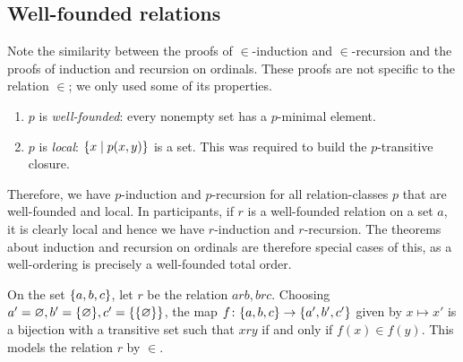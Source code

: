 \subsection{Well-founded relations}
Note the similarity between the proofs of \( \in \)-induction and \( \in \)-recursion and the proofs of induction and recursion on ordinals.
These proofs are not specific to the relation \( \in \); we only used some of its properties.
\begin{enumerate}
    \item \( p \) is \emph{well-founded}: every nonempty set has a \( p \)-minimal element.
    \item \( p \) is \emph{local}: \( \qty{x \mid p(x,y)} \) is a set.
    This was required to build the \( p \)-transitive closure.
\end{enumerate}
Therefore, we have \( p \)-induction and \( p \)-recursion for all relation-classes \( p \) that are well-founded and local.
In participants, if \( r \) is a well-founded relation on a set \( a \), it is clearly local and hence we have \( r \)-induction and \( r \)-recursion.
The theorems about induction and recursion on ordinals are therefore special cases of this, as a well-ordering is precisely a well-founded total order.

On the set \( \qty{a, b, c} \), let \( r \) be the relation \( arb, brc \).
Choosing \( a' = \varnothing, b' = \qty{\varnothing}, c' = \qty{\qty{\varnothing}} \), the map \( f \colon \qty{a, b, c} \to \qty{a', b', c'} \) given by \( x \mapsto x' \) is a bijection with a transitive set such that \( xry \) if and only if \( f(x) \in f(y) \).
This models the relation \( r \) by \( \in \).

